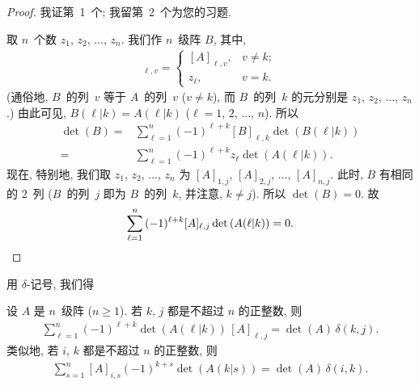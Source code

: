 \documentclass[../libro.tex]{subfiles}
\begin{document}
\begin{proof}
    我证第~1~个; 我留第~2~个为您的习题.

    取 \(n\)~个数 \(z_1\), \(z_2\), \(\dots\), \(z_n\).
    我们作 \(n\)~级阵 \(B\), 其中,
    \begin{align*}
        [B]_{\ell, v} =
        \begin{cases}
            [A]_{\ell, v}, & v \neq k; \\
            z_\ell,        & v = k.
        \end{cases}
    \end{align*}
    (通俗地, \(B\)~的列~\(v\) 等于 \(A\)~的列~\(v\) %
    (\(v \neq k\)),
    而 \(B\)~的列~\(k\) 的元分别是
    \(z_1\), \(z_2\), \(\dots\), \(z_n\).) %
    由此可见, \(B(\ell|k) = A(\ell|k)\)
    (\(\ell = 1\), \(2\), \(\dots\), \(n\)).
    所以
    \begin{align*}
        \det {(B)}
        = {} & \sum_{\ell = 1}^{n}
        {(-1)^{\ell + k} [B]_{\ell, k} \det {(B(\ell|k))}}
        \\
        = {} & \sum_{\ell = 1}^{n}
        {(-1)^{\ell + k} z_\ell \det {(A(\ell|k))}}.
    \end{align*}
    现在, 特别地, 我们取
    \(z_1\), \(z_2\), \(\dots\), \(z_n\)
    为
    \([A]_{1,j}\), \([A]_{2,j}\), \(\dots\), \([A]_{n,j}\).
    此时, \(B\) 有相同的 \(2\)~列
    (\(B\)~的列~\(j\) 即为 \(B\)~的列~\(k\),
    并注意, \(k \neq j\)).
    所以 \(\det {(B)} = 0\).
    故
    \begin{equation*}
        \sum_{\ell = 1}^{n}
        {(-1)^{\ell+k} [A]_{\ell,j} \det {(A(\ell|k))}}
        = 0.
        \qedhere
    \end{equation*}
\end{proof}

用 \(\delta\)-记号, 我们得

\begin{theorem}
    设 \(A\) 是 \(n\)~级阵 (\(n \geq 1\)).
    若 \(k\), \(j\) 都是不超过 \(n\) 的正整数,
    则
    \begin{align*}
        \sum_{\ell = 1}^{n}
        {(-1)^{\ell+k} \det {(A(\ell|k))}\, [A]_{\ell,j}}
        = \det {(A)}\, \delta(k, j).
    \end{align*}
    类似地, 若 \(i\), \(k\) 都是不超过 \(n\) 的正整数,
    则
    \begin{align*}
        \sum_{s = 1}^{n}
        {[A]_{i,s} (-1)^{k+s} \det {(A(k|s))}}
        = \det{(A)}\, \delta(i, k).
    \end{align*}
\end{theorem}
\end{document}
